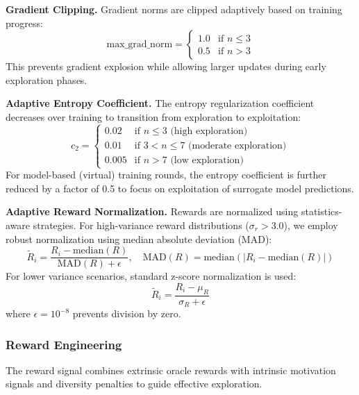 \textbf{Gradient Clipping.} Gradient norms are clipped adaptively based on training progress:
%
\begin{equation}
\text{max\_grad\_norm} = \begin{cases}
1.0 & \text{if } n \leq 3 \\
0.5 & \text{if } n > 3
\end{cases}
\end{equation}
%
This prevents gradient explosion while allowing larger updates during early exploration phases.

\textbf{Adaptive Entropy Coefficient.} The entropy regularization coefficient decreases over training to transition from exploration to exploitation:
%
\begin{equation}
c_2 = \begin{cases}
0.02 & \text{if } n \leq 3 \text{ (high exploration)} \\
0.01 & \text{if } 3 < n \leq 7 \text{ (moderate exploration)} \\
0.005 & \text{if } n > 7 \text{ (low exploration)}
\end{cases}
\end{equation}
%
For model-based (virtual) training rounds, the entropy coefficient is further reduced by a factor of 0.5 to focus on exploitation of surrogate model predictions.

\textbf{Adaptive Reward Normalization.} Rewards are normalized using statistics-aware strategies. For high-variance reward distributions ($\sigma_r > 3.0$), we employ robust normalization using median absolute deviation (MAD):
%
\begin{equation}
\tilde{R}_i = \frac{R_i - \text{median}(R)}{\text{MAD}(R) + \epsilon}, \quad \text{MAD}(R) = \text{median}(|R_i - \text{median}(R)|)
\end{equation}
%
For lower variance scenarios, standard z-score normalization is used:
%
\begin{equation}
\tilde{R}_i = \frac{R_i - \mu_R}{\sigma_R + \epsilon}
\end{equation}
%
where $\epsilon = 10^{-8}$ prevents division by zero.

\subsubsection{Reward Engineering}

The reward signal combines extrinsic oracle rewards with intrinsic motivation signals and diversity penalties to guide effective exploration.

